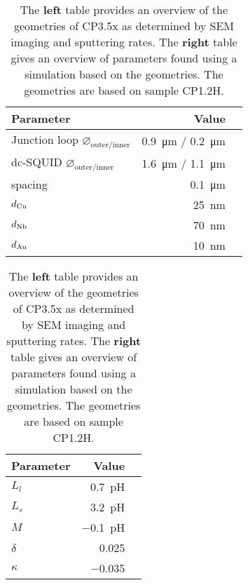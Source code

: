 \begin{table}
	\begin{subtable}{.6\linewidth}
		\begin{tabular}[t]{@{}lrr@{}}
			\toprule
			Parameter & Value \\ \midrule
			Junction loop $\diameter_{\text{outer/inner}}$ & \qty{0.9}{\micro\meter} / \qty{0.2}{\micro\meter} \\
			dc-SQUID $\diameter_{\text{outer/inner}}$ & \qty{1.6}{\micro\meter} / \qty{1.1}{\micro\meter} \\
			spacing & \qty{0.1}{\micro\meter} \\
			$d_{\ce{Cu}}$ & \qty{25}{\nano\meter} \\
			$d_{\ce{Nb}}$ & \qty{70}{\nano\meter} \\
			$d_{\ce{Au}}$ & \qty{10}{\nano\meter} \\
			\bottomrule
		\end{tabular}
    \end{subtable}
    \hfill
    \begin{subtable}{.3\linewidth}
    	\flushright
    	\begin{tabular}[t]{@{}lrr@{}}
    		\toprule
    		Parameter & Value \\ \midrule
    		$L_{l}$ & \qty{0.7}{\pico\henry} \\
			$L_{s}$ & \qty{3.2}{\pico\henry} \\
			$M$ & \qty{-0.1}{\pico\henry} \\
			$\delta$ & \num{0.025} \\
			$\kappa$ & \num{-0.035} \\
    		\bottomrule
    	\end{tabular}
    \end{subtable}
    \caption{The \textbf{left} table provides an overview of the geometries of CP3.5x as determined by SEM imaging and sputtering rates. The \textbf{right} table gives an overview of parameters found using a simulation based on the geometries. The geometries are based on sample CP1.2H.}
    \label{tab:CP3.5x-geometries}
\end{table}